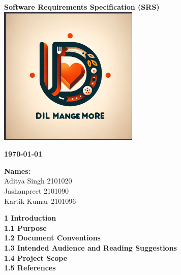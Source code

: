 \documentclass{article}
\begin{document}
\begin{titlepage}
    \centering
    \vspace*{1cm}
    {\Huge\bfseries Software Requirements Specification (SRS)\\[2cm]}
    \includegraphics[width=0.5\textwidth]{Logo.png} %
    \vspace{1cm}
    
    {\Large\bfseries \today\\[2cm]}
     \hspace*{\fill}
     \begin{minipage}{0.4\textwidth}
         \begin{flushright}
             \textbf{Names:}\\
             Aditya Singh 2101020\\
             Jashanpreet 2101090\\
             Kartik Kumar 2101096
         \end{flushright}
     \end{minipage}
\end{titlepage}



\newpage
\tableofcontents

\noindent
\textbf{1 Introduction} \\
\hspace*{10mm}\textbf{1.1 Purpose} \\
\hspace*{10mm}\textbf{1.2 Document Conventions} \\
\hspace*{10mm}\textbf{1.3 Intended Audience and Reading Suggestions} \\ 
\hspace*{10mm}\textbf{1.4 Project Scope} \\
\hspace*{10mm}\textbf{1.5 References} \\
\end{document}

